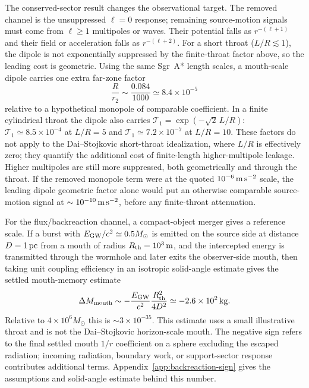 \documentclass[aps,prd,10pt,onecolumn,nofootinbib,superscriptaddress,floatfix]{revtex4-2}
\begin{document}
The conserved-sector result changes the observational target.  The removed
channel is the unsuppressed $\ell=0$ response; remaining source-motion signals
must come from $\ell\ge1$ multipoles or waves.  Their potential falls as
$r^{-(\ell+1)}$ and their field or acceleration falls as $r^{-(\ell+2)}$.  For
a short throat ($L/R\lesssim1$), the dipole is not exponentially suppressed by
the finite-throat factor above, so the leading cost is geometric.  Using the
same Sgr~A* length scales, a mouth-scale dipole carries one extra far-zone
factor
\begin{equation}
  \frac{R}{r_2}\sim \frac{0.084}{1000}\simeq 8.4\times10^{-5}
\end{equation}
relative to a hypothetical monopole of comparable coefficient.  In a finite
cylindrical throat the dipole also carries
$\mathcal T_1=\exp(-\sqrt2\,L/R)$: $\mathcal T_1\simeq8.5\times10^{-4}$ at
$L/R=5$ and $\mathcal T_1\simeq7.2\times10^{-7}$ at $L/R=10$.  These factors do
not apply to the Dai--Stojkovic short-throat idealization, where $L/R$ is
effectively zero; they quantify the additional cost of finite-length
higher-multipole leakage.  Higher multipoles are still more suppressed, both
geometrically and through the throat.  If the removed monopole term were at
the quoted $10^{-6}\,{\rm m\,s^{-2}}$ scale, the leading dipole geometric
factor alone would put an otherwise comparable source-motion signal at
$\sim10^{-10}\,{\rm m\,s^{-2}}$, before any finite-throat attenuation.

For the flux/backreaction channel, a compact-object merger gives a reference
scale.  If a burst with $E_{\rm GW}/c^2\simeq0.5M_\odot$ is emitted on the
source side at distance $D=1\,{\rm pc}$ from a mouth of radius
$R_{\rm th}=10^3\,{\rm m}$, and the intercepted energy is transmitted through
the wormhole and later exits the observer-side mouth, then taking unit coupling
efficiency in an isotropic solid-angle estimate gives the settled mouth-memory
estimate
\begin{equation}
  \Delta M_{\rm mouth}
  \sim
  -\frac{E_{\rm GW}}{c^2}\frac{R_{\rm th}^2}{4D^2}
  \simeq -2.6\times10^2\,{\rm kg}.
\end{equation}
Relative to $4\times10^6M_\odot$ this is $\sim3\times10^{-35}$.  This estimate
uses a small illustrative throat and is not the Dai--Stojkovic horizon-scale
mouth.  The negative sign refers to the final settled mouth $1/r$ coefficient
on a sphere excluding the escaped radiation; incoming radiation, boundary work,
or support-sector response contributes additional terms.
Appendix~\ref{app:backreaction-sign} gives the assumptions and solid-angle estimate
behind this number.
\end{document}
